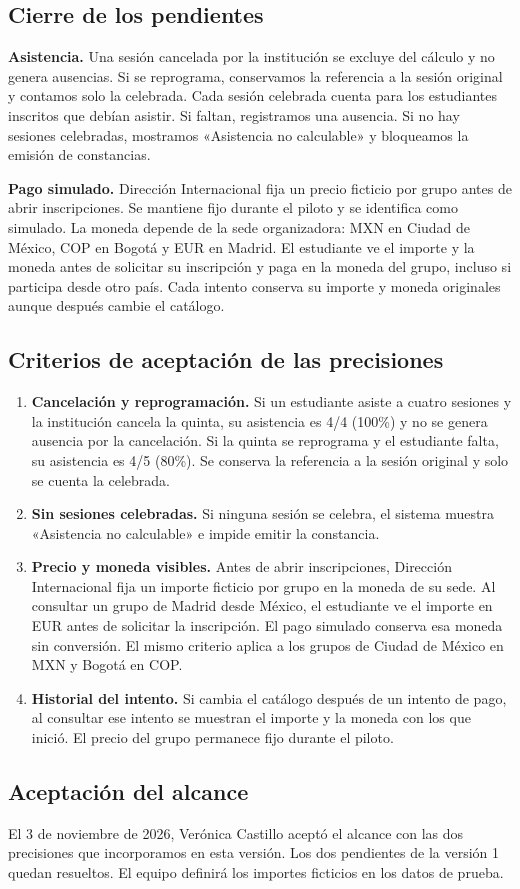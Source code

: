 \documentclass[11pt,letterpaper]{article}
\newcommand{\apartado}[1]{\subsection*{\textcolor{azul}{#1}}}
\begin{document}
\apartado{Cierre de los pendientes}
\textbf{Asistencia.} Una sesión cancelada por la institución se excluye del cálculo y no genera ausencias. Si se reprograma, conservamos la referencia a la sesión original y contamos solo la celebrada. Cada sesión celebrada cuenta para los estudiantes inscritos que debían asistir. Si faltan, registramos una ausencia. Si no hay sesiones celebradas, mostramos «Asistencia no calculable» y bloqueamos la emisión de constancias.

\textbf{Pago simulado.} Dirección Internacional fija un precio ficticio por grupo antes de abrir inscripciones. Se mantiene fijo durante el piloto y se identifica como simulado. La moneda depende de la sede organizadora: MXN en Ciudad de México, COP en Bogotá y EUR en Madrid. El estudiante ve el importe y la moneda antes de solicitar su inscripción y paga en la moneda del grupo, incluso si participa desde otro país. Cada intento conserva su importe y moneda originales aunque después cambie el catálogo.

\newpage
\apartado{Criterios de aceptación de las precisiones}
\begin{enumerate}
\item \textbf{Cancelación y reprogramación.} Si un estudiante asiste a cuatro sesiones y la institución cancela la quinta, su asistencia es 4/4 (100\%) y no se genera ausencia por la cancelación. Si la quinta se reprograma y el estudiante falta, su asistencia es 4/5 (80\%). Se conserva la referencia a la sesión original y solo se cuenta la celebrada.
\item \textbf{Sin sesiones celebradas.} Si ninguna sesión se celebra, el sistema muestra «Asistencia no calculable» e impide emitir la constancia.
\item \textbf{Precio y moneda visibles.} Antes de abrir inscripciones, Dirección Internacional fija un importe ficticio por grupo en la moneda de su sede. Al consultar un grupo de Madrid desde México, el estudiante ve el importe en EUR antes de solicitar la inscripción. El pago simulado conserva esa moneda sin conversión. El mismo criterio aplica a los grupos de Ciudad de México en MXN y Bogotá en COP.
\item \textbf{Historial del intento.} Si cambia el catálogo después de un intento de pago, al consultar ese intento se muestran el importe y la moneda con los que inició. El precio del grupo permanece fijo durante el piloto.
\end{enumerate}

\apartado{Aceptación del alcance}
El 3 de noviembre de 2026, Verónica Castillo aceptó el alcance con las dos precisiones que incorporamos en esta versión. Los dos pendientes de la versión 1 quedan resueltos. El equipo definirá los importes ficticios en los datos de prueba.
\end{document}
